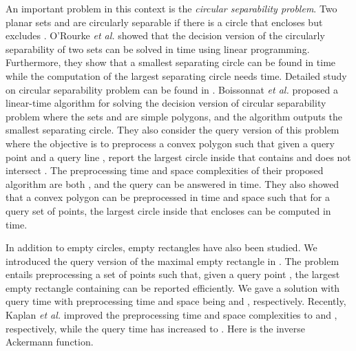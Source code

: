 \documentclass[12pt]{llncs}
\begin{document}
An important problem in this context is the {\it circular 
separability problem}. Two planar sets  and  are circularly 
separable if there is a circle that encloses  but excludes . 
O'Rourke {\it et al.} \cite{OKM86} showed that the decision version of the circularly 
separability of two sets can be solved in  time using linear 
programming. Furthermore, they show that a smallest separating circle can be found 
in  time while the computation of the largest separating circle needs 
 time. Detailed study on circular separability problem can be 
found in \cite{BCDUY00,BCOY01,Fisk86,OKM86}. Boissonnat {\it et al.} \cite{BCOY01}
proposed a linear-time algorithm for solving the decision version of
circular separability problem where the sets  and  are simple
polygons, and the algorithm outputs the smallest separating circle. They also 
consider the query version of this problem where the objective is to
preprocess a convex polygon  such that given a query point  and a query
line ,  report the largest circle inside  that contains  and
does not intersect . The preprocessing time and space
complexities of their proposed algorithm are both , and the query
can be answered in  time. They also showed that a convex polygon
 can be preprocessed in  time and space such that for a query set 
of  points, the largest circle inside  that encloses  can be computed
in  time.

In addition to empty circles, empty rectangles have also been studied. We introduced the query version of the maximal empty rectangle in \cite{ADMNRS10}. The problem entails preprocessing a set of  points such that, given a query point , the largest empty rectangle containing  can be reported efficiently. We gave a solution with  query time   with preprocessing time and space being  and , respectively.
Recently, Kaplan {\it et al.} \cite{KMNS12} improved the preprocessing time 
and space complexities  to  and 
, respectively, while the query time has increased to 
. Here  is the inverse Ackermann function.
\end{document}

